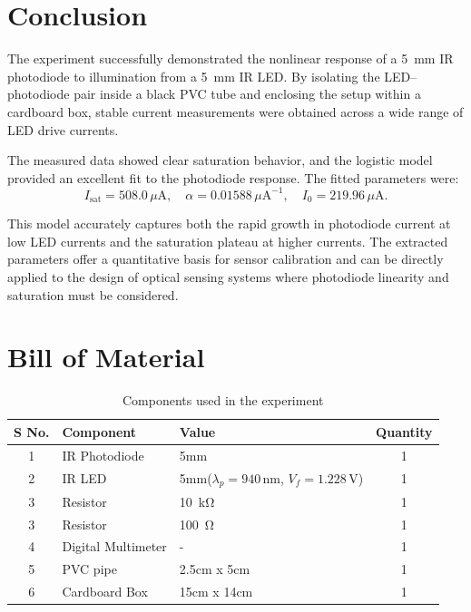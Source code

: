 \documentclass[12pt]{article}
\begin{document}
\newpage
\section{Conclusion}

The experiment successfully demonstrated the nonlinear response of a \SI{5}{\milli\meter} IR photodiode to illumination from a \SI{5}{\milli\meter} IR LED. By isolating the LED–photodiode pair inside a black PVC tube and enclosing the setup within a cardboard box, stable current measurements were obtained across a wide range of LED drive currents.  

The measured data showed clear saturation behavior, and the logistic model provided an excellent fit to the photodiode response. The fitted parameters were:  
\[
I_{\text{sat}} = 508.0 \, \mu\text{A}, \quad 
\alpha = 0.01588 \, \mu\text{A}^{-1}, \quad
I_{0} = 219.96 \, \mu\text{A}.
\]

This model accurately captures both the rapid growth in photodiode current at low LED currents and the saturation plateau at higher currents. The extracted parameters offer a quantitative basis for sensor calibration and can be directly applied to the design of optical sensing systems where photodiode linearity and saturation must be considered.




\section{Bill of Material}

\begin{table}[H]
\centering
\begin{tabular}{|c|l|l|c|}
\hline
\textbf{S No.} & \textbf{Component} & \textbf{Value} & \textbf{Quantity} \\ \hline
1  & IR Photodiode & 5mm & 1 \\
2 &  IR LED & 5mm($\lambda_p = 940$\,nm, $V_f = 1.228$\,V)  & 1\\
3 & Resistor & \SI{10}{\kilo\ohm} & 1\\
3 & Resistor & \SI{100}{\ohm} & 1\\
4 & Digital Multimeter & -  & 1 \\
5 & PVC pipe & 2.5cm x 5cm  & 1  \\
6 & Cardboard Box & 15cm x 14cm &  1  \\

\hline
\end{tabular}
\caption{Components used in the  experiment}
\end{table}
\end{document}
